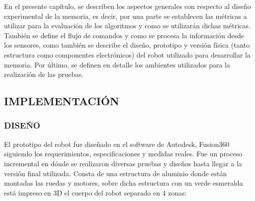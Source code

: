 En el presente capítulo, se describen los aspectos generales con respecto al diseño experimental de la memoria, es decir, por una parte se establecen las métricas a utilizar para la evaluación de los algoritmos y como se utilizarán dichas métricas. También se define el flujo de comandos y como se procesa la información desde los sensores, como también se describe el diseño, prototipo y versión física (tanto estructura como componentes electrónicos) del robot utilizado para desarrollar la memoria. Por último, se definen en detalle los ambientes utilizados para la realización de las pruebas.

\subsection{IMPLEMENTACIÓN}
\subsubsection{DISEÑO}
El prototipo del robot fue diseñado en el software de Autodesk, Fusion360 siguiendo los requerimientos, especificaciones y medidas reales. Fue un proceso incremental en dónde se realizaron diversas pruebas y diseños hasta llegar a la versión final utilizada. Consta de una estructura de aluminio donde están montadas las ruedas y motores, sobre dicha estructura con un verde esmeralda está impreso en 3D el cuerpo del robot separado en 4 zonas:
